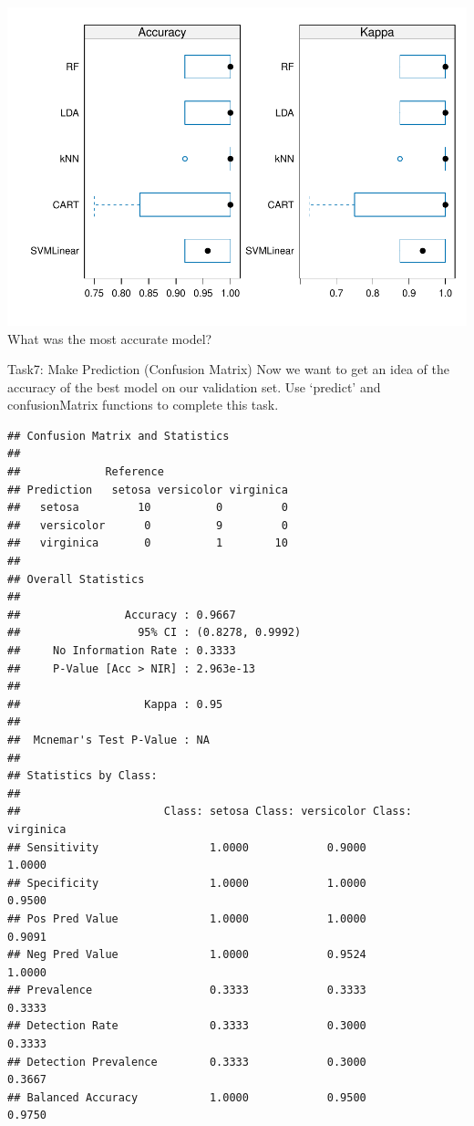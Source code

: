 \documentclass[
]{article}
\newenvironment{Shaded}{\begin{snugshade}}{\end{snugshade}}
\newcommand{\AttributeTok}[1]{\textcolor[rgb]{0.13,0.29,0.53}{#1}}
\newcommand{\CommentTok}[1]{\textcolor[rgb]{0.56,0.35,0.01}{\textit{#1}}}
\newcommand{\FunctionTok}[1]{\textcolor[rgb]{0.13,0.29,0.53}{\textbf{#1}}}
\newcommand{\NormalTok}[1]{#1}
\newcommand{\OtherTok}[1]{\textcolor[rgb]{0.56,0.35,0.01}{#1}}
\newcommand{\SpecialCharTok}[1]{\textcolor[rgb]{0.81,0.36,0.00}{\textbf{#1}}}
\begin{document}
\includegraphics{caret_lab_files/figure-latex/unnamed-chunk-12-1.pdf}
What was the most accurate model?

Task7: Make Prediction (Confusion Matrix) Now we want to get an idea of
the accuracy of the best model on our validation set. Use `predict' and
confusionMatrix functions to complete this task.

\begin{Shaded}
\end{Shaded}

\begin{verbatim}
## Confusion Matrix and Statistics
## 
##             Reference
## Prediction   setosa versicolor virginica
##   setosa         10          0         0
##   versicolor      0          9         0
##   virginica       0          1        10
## 
## Overall Statistics
##                                           
##                Accuracy : 0.9667          
##                  95% CI : (0.8278, 0.9992)
##     No Information Rate : 0.3333          
##     P-Value [Acc > NIR] : 2.963e-13       
##                                           
##                   Kappa : 0.95            
##                                           
##  Mcnemar's Test P-Value : NA              
## 
## Statistics by Class:
## 
##                      Class: setosa Class: versicolor Class: virginica
## Sensitivity                 1.0000            0.9000           1.0000
## Specificity                 1.0000            1.0000           0.9500
## Pos Pred Value              1.0000            1.0000           0.9091
## Neg Pred Value              1.0000            0.9524           1.0000
## Prevalence                  0.3333            0.3333           0.3333
## Detection Rate              0.3333            0.3000           0.3333
## Detection Prevalence        0.3333            0.3000           0.3667
## Balanced Accuracy           1.0000            0.9500           0.9750
\end{verbatim}
\end{document}
